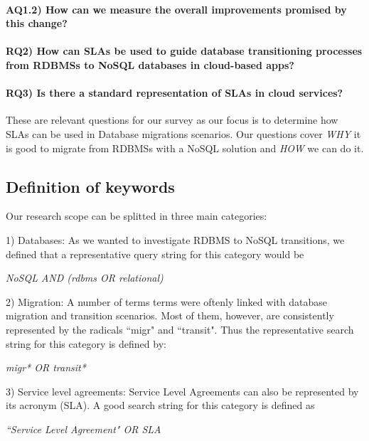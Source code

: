 \documentclass{article}
\begin{document}
\paragraph*{\textbf{AQ1.2)} How can we measure the overall improvements promised by this change?}

\paragraph*{\textbf{RQ2)} How can SLAs be used to guide database transitioning processes from RDBMSs to NoSQL databases in cloud-based apps? }
\paragraph*{\textbf{RQ3)} Is there a standard representation of SLAs in cloud services?}

These are relevant questions for our survey as our focus is to determine how SLAs can be used in Database migrations scenarios. Our questions cover \textit{WHY} it is good to migrate from RDBMSs with a NoSQL solution and \textit{HOW} we can do it. 


\subsection{Definition of keywords}

Our research scope can be splitted in three main categories: 

1) Databases: As we wanted to investigate RDBMS to NoSQL transitions, we defined that a representative query string for this category would be 

\begin{center}
\textit{NoSQL AND (rdbms OR relational)}
\end{center}

2) Migration: A number of terms terms were oftenly linked with database migration and transition scenarios. Most of them, however, are consistently represented by the radicals ``migr" and ``transit". Thus the representative search string for this category is defined by: 


\begin{center}
\textit{migr* OR transit*}
\end{center}


3) Service level agreements: Service Level Agreements can also be represented by its acronym (SLA). A good search string for this category is defined as 
\begin{center}
\textit{``Service Level Agreement" OR SLA}
\end{center}
\end{document}
